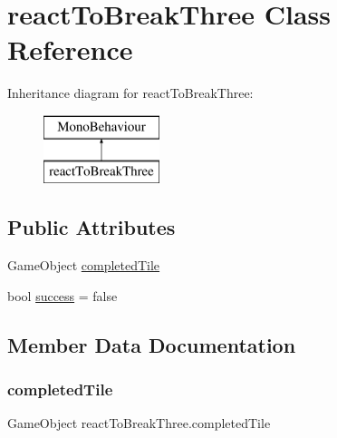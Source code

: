 \hypertarget{classreact_to_break_three}{}\section{react\+To\+Break\+Three Class Reference}
\label{classreact_to_break_three}
Inheritance diagram for react\+To\+Break\+Three\+:\begin{figure}[H]
\begin{center}
\leavevmode
\includegraphics[height=2.000000cm]{classreact_to_break_three}
\end{center}
\end{figure}
\subsection*{Public Attributes}
\begin{DoxyCompactItemize}
\item 
Game\+Object \hyperlink{classreact_to_break_three_a8f70f4c7df6079c13ad76b092f308aef}{completed\+Tile}
\item 
bool \hyperlink{classreact_to_break_three_a1479ec57d4742856358390bdde7b529c}{success} = false
\end{DoxyCompactItemize}


\subsection{Member Data Documentation}
\mbox{\label{classreact_to_break_three_a8f70f4c7df6079c13ad76b092f308aef}} 
\subsubsection{\texorpdfstring{completed\+Tile}{completedTile}}
{\footnotesize\ttfamily Game\+Object react\+To\+Break\+Three.\+completed\+Tile}

\mbox{\label{classreact_to_break_three_a1479ec57d4742856358390bdde7b529c}} 

